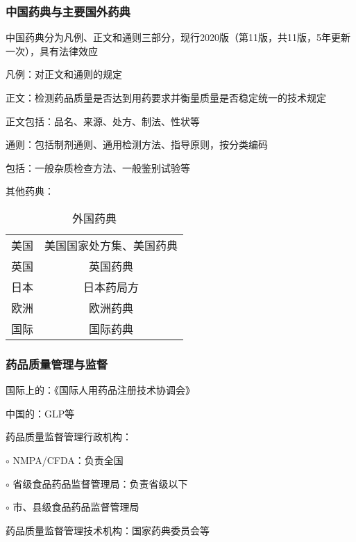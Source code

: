 \subsubsection{中国药典与主要国外药典}%
\label{subsub:中国药典与主要国外药典}
中国药典分为凡例、正文和通则三部分，现行2020版（第11版，共11版，5年更新一次），具有法律效应
\begin{notation}
    凡例：对正文和通则的规定
\end{notation}
\begin{notation}
    正文：检测药品质量是否达到用药要求并衡量质量是否稳定统一的技术规定

    正文包括：品名、来源、处方、制法、性状等
\end{notation}
\begin{notation}
    通则：包括制剂通则、通用检测方法、指导原则，按分类编码

    包括：一般杂质检查方法、一般鉴别试验等
\end{notation}
其他药典：
\begin{table}[htpb]
    \centering
    \caption{外国药典}
    \label{tab:外国药典}
    \begin{tabular}{cc}
        \toprule
    美国 & 美国国家处方集、美国药典\\
    英国 & 英国药典\\
    日本 & 日本药局方\\
    欧洲 & 欧洲药典\\
    国际 & 国际药典\\
    \bottomrule
    \end{tabular}
\end{table}
\subsubsection{药品质量管理与监督}%
\label{subsub:药品质量管理与监督}
国际上的：《国际人用药品注册技术协调会》

中国的：GLP等

\begin{notation}
    药品质量监督管理行政机构：

    $\circ$ NMPA/CFDA：负责全国

    $\circ$ 省级食品药品监督管理局：负责省级以下

    $\circ$ 市、县级食品药品监督管理局
\end{notation}
\begin{notation}
    药品质量监督管理技术机构：国家药典委员会等
\end{notation}
